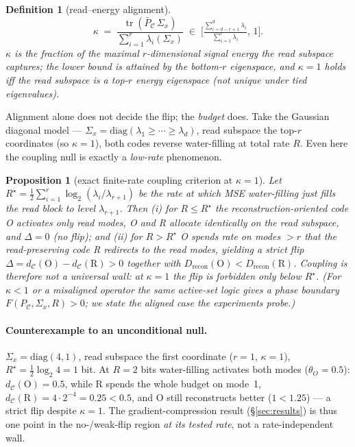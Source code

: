 \documentclass[10pt]{article} %
\newtheorem{proposition}{Proposition}
\newtheorem{definition}{Definition}
\theoremstyle{remark}
\newcommand{\PC}{P_{\mathcal{C}}}
\newcommand{\PCbar}{\bar P_{\mathcal{C}}}
\newcommand{\Sx}{\Sigma_{x}}
\newcommand{\tr}{\operatorname{tr}}
\newcommand{\kalign}{\kappa}
\begin{document}
\begin{definition}[read--energy alignment]\label{def:kappa}
\begin{equation}
\kalign \;=\; \frac{\tr(\PCbar\,\Sx)}{\sum_{i=1}^{r}\lambda_i(\Sx)}
\;\in\;\Big[\tfrac{\sum_{i=d-r+1}^{d}\lambda_i}{\sum_{i=1}^{r}\lambda_i},\,1\Big].
\end{equation}
$\kalign$ is the fraction of the maximal $r$-dimensional signal energy the read subspace
captures; the lower bound is attained by the bottom-$r$ eigenspace, and $\kalign=1$ holds
iff the read subspace \emph{is} a top-$r$ energy eigenspace (not unique under tied
eigenvalues).
\end{definition}

\noindent Alignment alone does not decide the flip; the \emph{budget} does. Take the
Gaussian diagonal model --- $\Sx=\mathrm{diag}(\lambda_1\ge\cdots\ge\lambda_d)$, read
subspace the top-$r$ coordinates (so $\kalign=1$), both codes reverse water-filling at total
rate $R$. Even here the coupling null is exactly a \emph{low-rate} phenomenon.

\begin{proposition}[exact finite-rate coupling criterion at $\kalign=1$]\label{prop:kappa}
Let $R^\star=\tfrac12\sum_{i=1}^{r}\log_2(\lambda_i/\lambda_{r+1})$ be the rate at which MSE
water-filling just fills the read block to level $\lambda_{r+1}$. Then
\emph{(i)} for $R\le R^\star$ the reconstruction-oriented code O activates only read modes, O
and R allocate identically on the read subspace, and $\Delta=0$ (no flip); and
\emph{(ii)} for $R>R^\star$ O spends rate on modes $>r$ that the read-preserving code R
redirects to the read modes, yielding a strict flip
$\Delta=d_{\mathcal C}(\mathrm O)-d_{\mathcal C}(\mathrm R)>0$ together with
$D_{\mathrm{recon}}(\mathrm O)<D_{\mathrm{recon}}(\mathrm R)$. Coupling is therefore
\emph{not} a universal wall: at $\kalign=1$ the flip is forbidden only below $R^\star$. (For
$\kalign<1$ or a misaligned operator the same active-set logic gives a phase boundary
$F(\PC,\Sx,R)>0$; we state the aligned case the experiments probe.)
\end{proposition}

\paragraph{Counterexample to an unconditional null.} $\Sx=\mathrm{diag}(4,1)$, read subspace
the first coordinate ($r{=}1$, $\kalign{=}1$), $R^\star=\tfrac12\log_2 4=1$ bit. At $R=2$
bits water-filling activates both modes ($\theta_O{=}0.5$): $d_{\mathcal C}(\mathrm O)=0.5$,
while R spends the whole budget on mode~1, $d_{\mathcal C}(\mathrm R)=4\cdot2^{-4}=0.25<0.5$,
and O still reconstructs better ($1<1.25$) --- a strict flip despite $\kalign=1$. The
gradient-compression result (\S\ref{sec:results}) is thus one point in the no-/weak-flip
region \emph{at its tested rate}, not a rate-independent wall.
\end{document}
